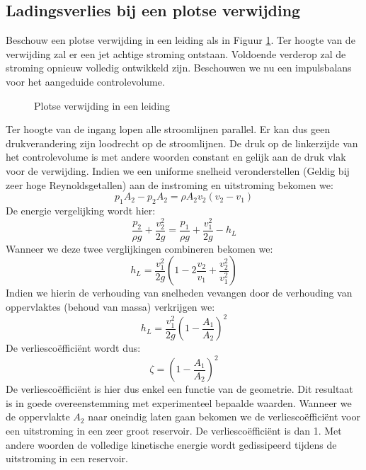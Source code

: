 	\subsection{Ladingsverlies bij een plotse verwijding}
Beschouw een plotse verwijding in een leiding als in Figuur \ref{fig:Plotse verwijding}. Ter hoogte van de verwijding zal er een jet achtige stroming ontstaan. Voldoende verderop zal de stroming opnieuw volledig ontwikkeld zijn. Beschouwen we nu een impulsbalans voor het aangeduide controlevolume.
\begin{figure}
	\centering
	
	\caption{Plotse verwijding in een leiding}
	\label{fig:Plotse verwijding}
\end{figure}
Ter hoogte van de ingang lopen alle stroomlijnen parallel. Er kan dus geen drukverandering zijn loodrecht op de stroomlijnen. De druk op de linkerzijde van het controlevolume is met andere woorden constant en gelijk aan de druk vlak voor de verwijding. Indien we een uniforme snelheid veronderstellen (Geldig bij zeer hoge Reynoldsgetallen) aan de instroming en uitstroming bekomen we:
\begin{equation}
	p_1 A_2 - p_2 A_2 = \rho A_2 v_2 (v_2-v_1)
\end{equation}
De energie vergelijking wordt hier:
\begin{equation}
	\frac{p_2}{\rho g} + \frac{v_2^2}{2 g} = \frac{p_1}{\rho g} + \frac{v_1^2}{2 g} - h_L
\end{equation}
Wanneer we deze twee verglijkingen combineren bekomen we:
\begin{equation}
	h_L = \frac{v_1^2}{2 g} \left(1 - 2\frac{v_2}{v_1} + \frac{v_2^2}{v_1^2} \right)
\end{equation}
Indien we hierin de verhouding van snelheden vevangen door de verhouding van oppervlaktes (behoud van massa) verkrijgen we:
\begin{equation}
	h_L = \frac{v_1^2}{2 g} \left(1 - \frac{A_1}{A_2} \right)^2
\end{equation}
De verliesco\"effici\"ent wordt dus:
\begin{equation}
	\zeta = \left(1 - \frac{A_1}{A_2} \right)^2
\end{equation}
De verliesco\"effici\"ent is hier dus enkel een functie van de geometrie. Dit resultaat is in goede overeenstemming met experimenteel bepaalde waarden. Wanneer we de oppervlakte $A_2$ naar oneindig laten gaan bekomen we de verliesco\"effici\"ent voor een uitstroming in een zeer groot reservoir. De verliesco\"effici\"ent is dan 1. Met andere woorden de volledige kinetische energie wordt gedissipeerd tijdens de uitstroming in een reservoir.
	\FloatBarrier
